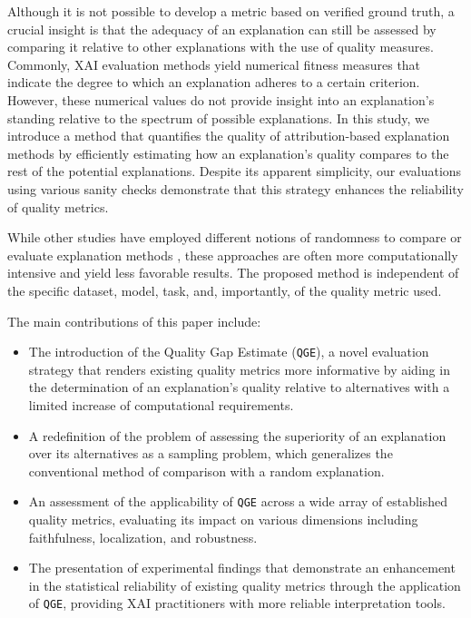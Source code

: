 Although it is not possible to develop a metric based on verified ground truth, a crucial insight is that the adequacy of an explanation can still be assessed by comparing it relative to other explanations with the use of quality measures. Commonly, XAI evaluation methods yield numerical fitness measures that indicate the degree to which an explanation adheres to a certain criterion. However, these numerical values do not provide insight into an explanation's standing relative to the spectrum of possible explanations. In this study, we introduce a method that quantifies the quality of attribution-based explanation methods by efficiently estimating how an explanation's quality compares to the rest of the potential explanations. Despite its apparent simplicity, our evaluations using various sanity checks demonstrate that this strategy enhances the reliability of quality metrics.

While other studies have employed different notions of randomness to compare or evaluate explanation methods \cite{findingrightbommer, samek2015, adebayo2018}, these approaches are often more computationally intensive and yield less favorable results. The proposed method is independent of the specific dataset, model, task, and, importantly, of the quality metric used.

The main contributions of this paper include:
\begin{itemize}
    \item The introduction of the Quality Gap Estimate (\texttt{QGE}), a novel evaluation strategy that renders existing quality metrics more informative by aiding in the determination of an explanation’s quality relative to alternatives with a limited increase of computational requirements.
    \item A redefinition of the problem of assessing the superiority of an explanation over its alternatives as a sampling problem, which generalizes the conventional method of comparison with a random explanation.
    \item An assessment of the applicability of \texttt{QGE} across a wide array of established quality metrics, evaluating its impact on various dimensions including faithfulness, localization, and robustness.
    \item The presentation of experimental findings that demonstrate an enhancement in the statistical reliability of existing quality metrics through the application of \texttt{QGE}, providing XAI practitioners with more reliable interpretation tools.
\end{itemize}